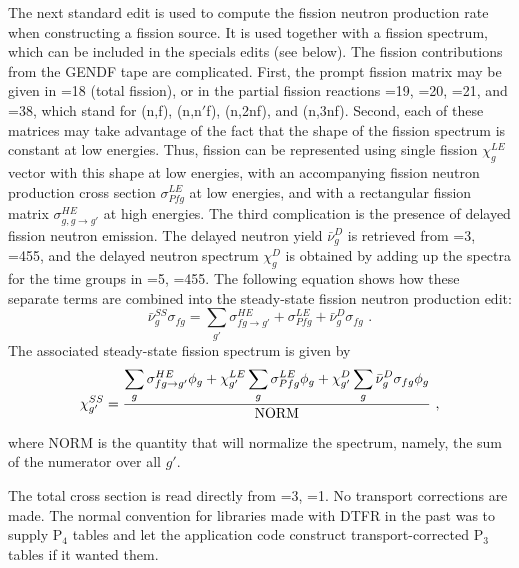 The next standard edit is used to compute the fission neutron
production rate when constructing a fission source.  It is used
together with a fission spectrum, which can be included in the
specials edits (see below). The fission contributions from the GENDF
tape are complicated.  First, the prompt fission matrix may be given in
=18 (total fission), or in the partial fission reactions
=19, =20, =21, and =38, which
stand for (n,f), (n,n$'$f),
(n,2nf), and (n,3nf).  Second, each of these matrices may take
advantage of the fact that the shape of the fission spectrum
is constant at low energies.  Thus, fission can be represented
using single fission $\chi^{LE}_g$ vector with this shape at low energies,
with an accompanying fission neutron production cross section
$\sigma^{LE}_{Pfg}$ at low energies, and with a rectangular fission
matrix $\sigma^{HE}_{g,g{\rightarrow}g'}$ at high energies.  The
third complication is the presence of delayed fission neutron emission.
The delayed neutron yield $\bar{\nu}^D_g$ is retrieved from
=3, =455,
and the delayed neutron spectrum $\chi^D_g$ is obtained by adding up
the spectra for the time groups in =5, =455.  The following
equation shows how these separate terms are combined into the
steady-state fission neutron production edit:
\begin{equation}
   \bar{\nu}^{SS}_g\sigma_{fg}=\displaystyle
      \sum_{g'}\sigma^{HE}_{fg{\rightarrow}g'}
     +\sigma^{LE}_{Pfg} + \bar{\nu}^D_g\sigma_{fg} \,\,.
\label{ssnu}
\end{equation}
The associated steady-state fission spectrum is given by
\begin{equation}
   \chi^{SS}_{g'}= \frac{\displaystyle\sum_g\sigma^{HE}_{fg{\rightarrow}g'}
      \phi_g + \chi^{LE}_{g'}\sum_g\sigma^{LE}_{Pfg}\phi_g
       +\chi^D_{g'}\sum_g\bar{\nu}^D_g\sigma_{fg}\phi_g}
         {\rm NORM} \,\,,
\label{sschi}
\end{equation}
\vspace{1 pt}

\noindent
where NORM is the quantity that will normalize the spectrum, namely,
the sum of the numerator over all $g'$.

The total cross section is read directly from =3, =1.  No
transport corrections are made.  The normal convention for libraries made with
DTFR in the past was to supply P$_4$ tables and let the application
code construct transport-corrected P$_3$ tables if it wanted them.

